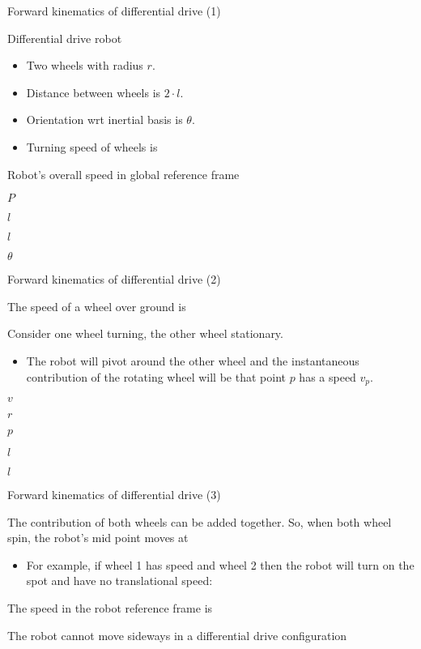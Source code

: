 \documentclass[compress]{beamer}
\begin{document}
\begin{frame}{Forward kinematics of differential drive (1)}

Differential drive robot

\begin{itemize}
    \item Two wheels with radius $r$.
    \item Distance between wheels is $2\cdot l$.
    \item Orientation wrt inertial basis is $\theta$.
    \item Turning speed of wheels is
\end{itemize}

Robot's overall speed in global reference frame

$P$

$l$

$l$

$\theta$

\end{frame}

\begin{frame}{Forward kinematics of differential drive (2)}

The speed of a wheel over ground is

Consider one wheel turning, the other wheel stationary.

\begin{itemize}
    \item The robot will pivot around the other wheel and the instantaneous
  contribution of the rotating wheel will be that point $p$ has a
  speed $v_p$.
\end{itemize}

$v$

$r$

$p$

$l$

$l$

\end{frame}

\begin{frame}{Forward kinematics of differential drive (3)}

The contribution of both wheels can be added together. So, when both
wheel spin, the robot's mid point moves at

\begin{itemize}
    \item For example, if wheel 1 has speed and wheel 2 then the robot will turn
  on the spot and have no translational speed:
\end{itemize}

The speed in the robot reference frame is

The robot cannot move sideways in a differential drive configuration

\end{frame}
\end{document}
